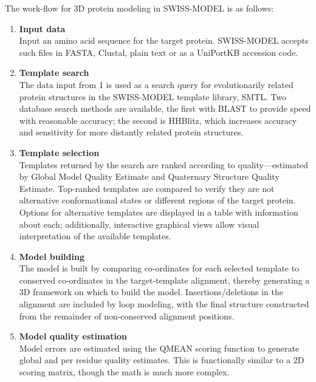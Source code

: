    The work-flow for 3D protein modeling in SWISS-MODEL is as follows:
    \begin{enumerate}

        \item \textbf{Input data} \\
        Input an amino acid sequence for the target protein. SWISS-MODEL accepts such files in FASTA, Clustal, plain text or as a UniPortKB accession code.\autocite{B15}

        \item \textbf{Template search} \\
        The data input from 1 is used as a search query for evolutionarily related protein structures in the SWISS-MODEL template library, SMTL. Two database search methods are available, the first with BLAST to provide speed with reasonable accuracy; the second is HHBlitz, which increases accuracy and sensitivity for more distantly related protein structures.\autocite{B15}

        \item \textbf{Template selection} \\
        Templates returned by the search are ranked according to quality---estimated by Global Model Quality Estimate and Quaternary Structure Quality Estimate.\autocite{B15} Top-ranked templates are compared to verify they are not alternative conformational states or different regions of the target protein.\autocite{B15} Options for alternative templates are displayed in a table with information about each; additionally, interactive graphical views allow visual interpretation of the available templates.\autocite{B15}
        
        \item \textbf{Model building} \\
        The model is built by comparing co-ordinates for each selected template to conserved co-ordinates in the target-template alignment, thereby generating a 3D framework on which to build the model.\autocite{B15} Insertions/deletions in the alignment are included by loop modeling, with the final structure constructed from the remainder of non-conserved alignment positions.\autocite{B15}

        \item \textbf{Model quality estimation} \\
        Model errors are estimated using the QMEAN scoring function to generate global and per residue quality estimates.\autocite{B15} This is functionally similar to a 2D scoring matrix, though the math is much more complex.

    \end{enumerate} 


